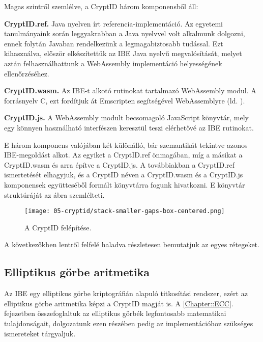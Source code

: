 Magas szintről szemlélve, a CryptID három komponensből áll:

\begin{outdentlist}
    \item[]\textbf{CryptID.ref.}
    Java nyelven írt referencia-implementáció. Az egyetemi tanulmányaink során leggyakrabban a Java nyelvvel volt alkalmunk dolgozni, ennek folytán Javaban rendelkezünk a legmagabiztosabb tudással. Ezt kihasználva, először elkészítettük az IBE Java nyelvű megvalósítását, melyet aztán felhasználhattunk a WebAssembly implementáció helyességének ellenőrzéséhez.

    \item[]\textbf{CryptID.wasm.}
    Az IBE-t alkotó rutinokat tartalmazó WebAssembly modul. A forrásnyelv C, ezt fordítjuk át Emscripten segítségével WebAssemblyre (ld. ).

    \item[]\textbf{CryptID.js.}
    A WebAssembly modult becsomagoló JavaScript könyvtár, mely egy könnyen használható interfészen keresztül teszi elérhetővé az IBE rutinokat.
\end{outdentlist}

E három komponens valójában két különálló, bár szemantikát tekintve azonos IBE-megoldást alkot. Az egyiket a CryptID.ref önmagában, míg a másikat a CryptID.wasm és arra építve a CryptID.js. A továbbiakban a CryptID.ref ismertetését elhagyjuk, és a CryptID néven a CryptID.wasm és a CryptID.js komponensek együtteséből formált könyvtárra fogunk hivatkozni. E könyvtár struktúráját az  ábra szemlélteti.

\begin{figure}[h]
    \centering
    \texttt{[image: 05-cryptid/stack-smaller-gaps-box-centered.png]}
    \caption{A CryptID felépítése.}
    \label{Figure::CryptID::Stack}
\end{figure}

A következőkben lentről felfelé haladva részletesen bemutatjuk az egyes rétegeket.

\subsection{Elliptikus görbe aritmetika}

Az IBE egy elliptikus görbe kriptográfián alapuló titkosítási rendszer, ezért az elliptikus görbe aritmetika képzi a CryptID magját is. A \ref{Chapter::ECC}. fejezetben összefoglaltuk az elliptikus görbék legfontosabb matematikai tulajdonságait, dolgozatunk ezen részében pedig az implementációhoz szükséges ismereteket tárgyaljuk.

